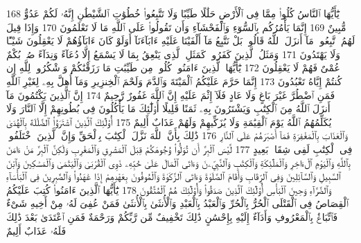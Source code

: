 {\tiny\colorbox{cl_aya}{168}} يَٰٓأَيُّهَا ٱلنَّاسُ كُلُوا۟ مِمَّا فِى ٱلْأَرْضِ حَلَٰلًا طَيِّبًا وَلَا تَتَّبِعُوا۟ خُطُوَٰتِ ٱلشَّيْطَٰنِ إِنَّهُۥ لَكُمْ عَدُوٌّ مُّبِينٌ
{\tiny\colorbox{cl_aya}{169}} إِنَّمَا يَأْمُرُكُم بِٱلسُّوٓءِ وَٱلْفَحْشَآءِ وَأَن تَقُولُوا۟ عَلَى ٱللَّهِ مَا لَا تَعْلَمُونَ
{\tiny\colorbox{cl_aya}{170}} وَإِذَا قِيلَ لَهُمُ ٱتَّبِعُوا۟ مَآ أَنزَلَ ٱللَّهُ قَالُوا۟ بَلْ نَتَّبِعُ مَآ أَلْفَيْنَا عَلَيْهِ ءَابَآءَنَآ أَوَلَوْ كَانَ ءَابَآؤُهُمْ لَا يَعْقِلُونَ شَيْـًٔا وَلَا يَهْتَدُونَ
{\tiny\colorbox{cl_aya}{171}} وَمَثَلُ ٱلَّذِينَ كَفَرُوا۟ كَمَثَلِ ٱلَّذِى يَنْعِقُ بِمَا لَا يَسْمَعُ إِلَّا دُعَآءً وَنِدَآءً صُمٌّۢ بُكْمٌ عُمْىٌ فَهُمْ لَا يَعْقِلُونَ
{\tiny\colorbox{cl_aya}{172}} يَٰٓأَيُّهَا ٱلَّذِينَ ءَامَنُوا۟ كُلُوا۟ مِن طَيِّبَٰتِ مَا رَزَقْنَٰكُمْ وَٱشْكُرُوا۟ لِلَّهِ إِن كُنتُمْ إِيَّاهُ تَعْبُدُونَ
{\tiny\colorbox{cl_aya}{173}} إِنَّمَا حَرَّمَ عَلَيْكُمُ ٱلْمَيْتَةَ وَٱلدَّمَ وَلَحْمَ ٱلْخِنزِيرِ وَمَآ أُهِلَّ بِهِۦ لِغَيْرِ ٱللَّهِ فَمَنِ ٱضْطُرَّ غَيْرَ بَاغٍ وَلَا عَادٍ فَلَآ إِثْمَ عَلَيْهِ إِنَّ ٱللَّهَ غَفُورٌ رَّحِيمٌ
{\tiny\colorbox{cl_aya}{174}} إِنَّ ٱلَّذِينَ يَكْتُمُونَ مَآ أَنزَلَ ٱللَّهُ مِنَ ٱلْكِتَٰبِ وَيَشْتَرُونَ بِهِۦ ثَمَنًا قَلِيلًا أُو۟لَٰٓئِكَ مَا يَأْكُلُونَ فِى بُطُونِهِمْ إِلَّا ٱلنَّارَ وَلَا يُكَلِّمُهُمُ ٱللَّهُ يَوْمَ ٱلْقِيَٰمَةِ وَلَا يُزَكِّيهِمْ وَلَهُمْ عَذَابٌ أَلِيمٌ
{\tiny\colorbox{cl_aya}{175}} أُو۟لَٰٓئِكَ ٱلَّذِينَ ٱشْتَرَوُا۟ ٱلضَّلَٰلَةَ بِٱلْهُدَىٰ وَٱلْعَذَابَ بِٱلْمَغْفِرَةِ فَمَآ أَصْبَرَهُمْ عَلَى ٱلنَّارِ
{\tiny\colorbox{cl_aya}{176}} ذَٰلِكَ بِأَنَّ ٱللَّهَ نَزَّلَ ٱلْكِتَٰبَ بِٱلْحَقِّ وَإِنَّ ٱلَّذِينَ ٱخْتَلَفُوا۟ فِى ٱلْكِتَٰبِ لَفِى شِقَاقٍۭ بَعِيدٍ
{\tiny\colorbox{cl_aya}{177}} لَّيْسَ ٱلْبِرَّ أَن تُوَلُّوا۟ وُجُوهَكُمْ قِبَلَ ٱلْمَشْرِقِ وَٱلْمَغْرِبِ وَلَٰكِنَّ ٱلْبِرَّ مَنْ ءَامَنَ بِٱللَّهِ وَٱلْيَوْمِ ٱلْءَاخِرِ وَٱلْمَلَٰٓئِكَةِ وَٱلْكِتَٰبِ وَٱلنَّبِيِّۦنَ وَءَاتَى ٱلْمَالَ عَلَىٰ حُبِّهِۦ ذَوِى ٱلْقُرْبَىٰ وَٱلْيَتَٰمَىٰ وَٱلْمَسَٰكِينَ وَٱبْنَ ٱلسَّبِيلِ وَٱلسَّآئِلِينَ وَفِى ٱلرِّقَابِ وَأَقَامَ ٱلصَّلَوٰةَ وَءَاتَى ٱلزَّكَوٰةَ وَٱلْمُوفُونَ بِعَهْدِهِمْ إِذَا عَٰهَدُوا۟ وَٱلصَّٰبِرِينَ فِى ٱلْبَأْسَآءِ وَٱلضَّرَّآءِ وَحِينَ ٱلْبَأْسِ أُو۟لَٰٓئِكَ ٱلَّذِينَ صَدَقُوا۟ وَأُو۟لَٰٓئِكَ هُمُ ٱلْمُتَّقُونَ
{\tiny\colorbox{cl_aya}{178}} يَٰٓأَيُّهَا ٱلَّذِينَ ءَامَنُوا۟ كُتِبَ عَلَيْكُمُ ٱلْقِصَاصُ فِى ٱلْقَتْلَى ٱلْحُرُّ بِٱلْحُرِّ وَٱلْعَبْدُ بِٱلْعَبْدِ وَٱلْأُنثَىٰ بِٱلْأُنثَىٰ فَمَنْ عُفِىَ لَهُۥ مِنْ أَخِيهِ شَىْءٌ فَٱتِّبَاعٌۢ بِٱلْمَعْرُوفِ وَأَدَآءٌ إِلَيْهِ بِإِحْسَٰنٍ ذَٰلِكَ تَخْفِيفٌ مِّن رَّبِّكُمْ وَرَحْمَةٌ فَمَنِ ٱعْتَدَىٰ بَعْدَ ذَٰلِكَ فَلَهُۥ عَذَابٌ أَلِيمٌ
